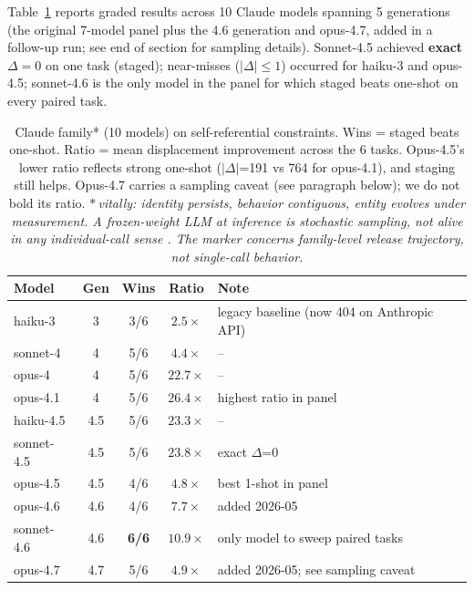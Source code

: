 \documentclass{article}
\theoremstyle{plain}
\theoremstyle{definition}
\theoremstyle{remark}
\begin{document}
Table~\ref{tab:claude_family} reports graded results across 10 Claude models spanning 5 generations (the original 7-model panel plus the 4.6 generation and opus-4.7, added in a follow-up run; see end of section for sampling details). Sonnet-4.5 achieved \textbf{exact} $\Delta=0$ on one task (staged); near-misses ($|\Delta|\leq 1$) occurred for haiku-3 and opus-4.5; sonnet-4.6 is the only model in the panel for which staged beats one-shot on every paired task.

\begin{table}[t]
\centering
\small
\caption{Claude family* (10 models) on self-referential constraints. Wins = staged beats one-shot. Ratio = mean displacement improvement across the 6 tasks. Opus-4.5's lower ratio reflects strong one-shot ($|\Delta|$=191 vs 764 for opus-4.1), and staging still helps. Opus-4.7 carries a sampling caveat (see paragraph below); we do not bold its ratio. \emph{$*$\,vitally: identity persists, behavior contiguous, entity evolves under measurement. A frozen-weight LLM at inference is stochastic sampling, not alive in any individual-call sense \citep{unherd2026aievolution}. The marker concerns family-level release trajectory, not single-call behavior.}}
\label{tab:claude_family}
\begin{tabular}{lcccl}
\toprule
Model & Gen & Wins & Ratio & Note \\
\midrule
haiku-3 & 3 & 3/6 & $2.5\times$ & legacy baseline (now 404 on Anthropic API) \\
sonnet-4 & 4 & 5/6 & $4.4\times$ & -- \\
opus-4 & 4 & 5/6 & $22.7\times$ & -- \\
opus-4.1 & 4 & 5/6 & $\mathbf{26.4\times}$ & highest ratio in panel \\
haiku-4.5 & 4.5 & 5/6 & $23.3\times$ & -- \\
sonnet-4.5 & 4.5 & 5/6 & $23.8\times$ & exact $\Delta$=0 \\
opus-4.5 & 4.5 & 4/6 & $4.8\times$ & best 1-shot in panel \\
opus-4.6 & 4.6 & 4/6 & $7.7\times$ & added 2026-05 \\
sonnet-4.6 & 4.6 & \textbf{6/6} & $10.9\times$ & only model to sweep paired tasks \\
opus-4.7 & 4.7 & 5/6 & $4.9\times$ & added 2026-05; see sampling caveat \\
\bottomrule
\end{tabular}
\end{table}
\end{document}
